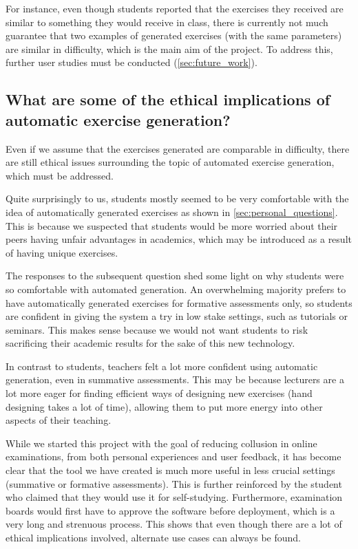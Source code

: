 \documentclass{l4proj}
\begin{document}
For instance, even though students reported that the exercises they received are similar to something they would receive in class, there is currently not much guarantee that two examples of generated exercises (with the same parameters) are similar in difficulty, which is the main aim of the project. To address this, further user studies must be conducted (\autoref{sec:future_work}).

\subsection*{What are some of the ethical implications of automatic exercise generation?}

Even if we assume that the exercises generated are comparable in difficulty, there are still ethical issues surrounding the topic of automated exercise generation, which must be addressed.

Quite surprisingly to us, students mostly seemed to be very comfortable with the idea of automatically generated exercises as shown in \autoref{sec:personal_questions}. This is because we suspected that students would be more worried about their peers having unfair advantages in academics, which may be introduced as a result of having unique exercises. 

The responses to the subsequent question shed some light on why students were so comfortable with automated generation. An overwhelming majority prefers to have automatically generated exercises for formative assessments only, so students are confident in giving the system a try in low stake settings, such as tutorials or seminars. This makes sense because we would not want students to risk sacrificing their academic results for the sake of this new technology.

In contrast to students, teachers felt a lot more confident using automatic generation, even in summative assessments. This may be because lecturers are a lot more eager for finding efficient ways of designing new exercises (hand designing takes a lot of time), allowing them to put more energy into other aspects of their teaching.

While we started this project with the goal of reducing collusion in online examinations, from both personal experiences and user feedback, it has become clear that the tool we have created is much more useful in less crucial settings (summative or formative assessments). This is further reinforced by the student who claimed that they would use it for self-studying. Furthermore, examination boards would first have to approve the software before deployment, which is a very long and strenuous process. This shows that even though there are a lot of ethical implications involved, alternate use cases can always be found.
\end{document}
